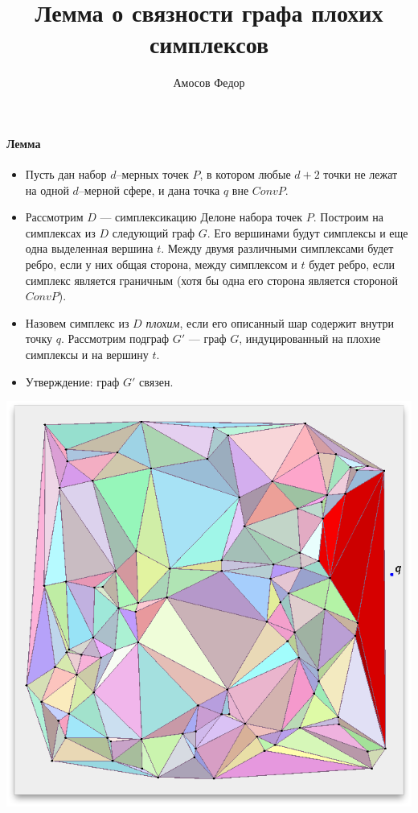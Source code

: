 \documentclass{article}
\title{\bf Лемма о связности графа плохих симплексов}
\author{Амосов Федор}
\begin{document}
	\maketitle

    \paragraph{Лемма\\}
        \begin{itemize}
            \item Пусть дан набор $d$--мерных точек $P$, в котором любые $d + 2$ точки не лежат на одной $d$--мерной сфере, и дана точка $q$ вне $Conv P$.
            \item Рассмотрим $D$ --- симплексикацию Делоне набора точек $P$.  Построим на симплексах из $D$ следующий граф $G$. Его вершинами будут симплексы и еще одна выделенная вершина $t$. Между двумя различными симплексами будет ребро, если у них общая сторона, между симплексом и $t$ будет ребро, если симплекс является граничным (хотя бы одна его сторона является стороной $Conv P$).
            \item Назовем симплекс из $D$ {\it плохим}, если его описанный шар содержит внутри точку $q$. Рассмотрим подграф $G'$ --- граф $G$, индуцированный на плохие симплексы и на вершину $t$.
            \item Утверждение: граф $G'$ связен.
        \end{itemize}
        
        \begin{center}
            \includegraphics[scale=0.45]{1.png} 
                   
        \end{center}
        
\end{document}
